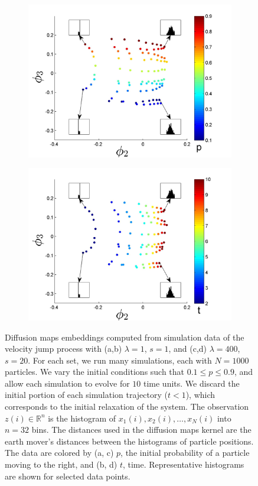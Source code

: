 \documentclass[prl, reprint]{revtex4-1}
\begin{document}
\begin{figure}[t!]
\begin{subfigure}{\figwidth}
\includegraphics[width=\textwidth]{EMD_withhist_p_400}
\caption{}
\label{subfig:large_lambda_p}
\end{subfigure}
\begin{subfigure}{\figwidth}
\includegraphics[width=\textwidth]{EMD_withhist_t_400}
\caption{}
\label{subfig:large_lambda_t}
\end{subfigure}
\caption{Diffusion maps embeddings computed from simulation data of the velocity jump process with (a,b) $\lambda=1$, $s=1$, and (c,d) $\lambda=400$, $s=20$.  For each set, we run many simulations, each with $N=1000$ particles.
%
We vary the initial conditions such that $0.1 \le p  \le 0.9$, and allow each simulation to evolve for $10$ time units.
%
We discard the initial portion of each simulation trajectory ($t < 1$), which corresponds to the initial relaxation of the system.
%
The observation $z(i) \in \mathbb{R}^n$ is the histogram of $x_1(i), x_2(i), \dots, x_N(i)$ into $n = 32$ bins.
%
The distances used in the diffusion maps kernel are the earth mover's distances between the histograms of particle positions. The data are colored by (a, c) $p$, the initial probability of a particle moving to the right, and (b, d) $t$, time. Representative histograms are shown for selected data points.}
\label{fig:dmaps_embed_emd}
\end{figure}
\end{document}
